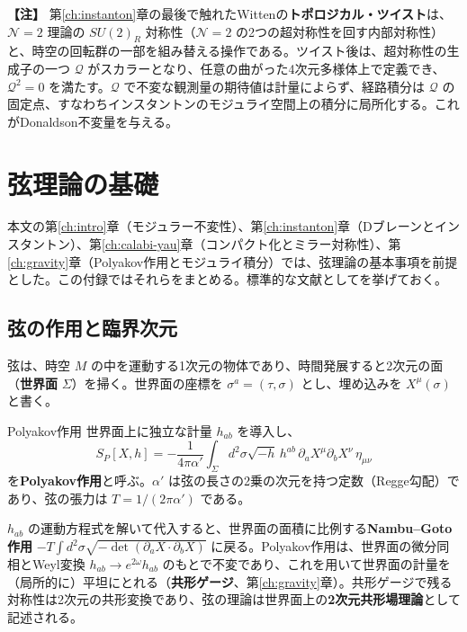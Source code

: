 \documentclass[uplatex, dvipdfmx, book]{jsbook}
\let\origsection\section
\let\origsubsection\subsection
\let\origsubsubsection\subsubsection
\newcommand{\chapter}{\origsection}
\renewcommand{\section}{\origsubsection}
\renewcommand{\subsection}{\origsubsubsection}
\renewcommand{\subsubsection}{\paragraph}
\newenvironment{note}{\vspace{1ex}\par\footnotesize\noindent\textbf{【注】}}{\par\vspace{1ex}}
\begin{document}
\begin{note}
第\ref{ch:instanton}章の最後で触れたWittenの\textbf{トポロジカル・ツイスト}は、$\mathcal{N} = 2$ 理論の $SU(2)_R$ 対称性（$\mathcal{N} = 2$ の2つの超対称性を回す内部対称性）と、時空の回転群の一部を組み替える操作である。ツイスト後は、超対称性の生成子の一つ $\mathcal{Q}$ がスカラーとなり、任意の曲がった4次元多様体上で定義でき、$\mathcal{Q}^2 = 0$ を満たす。$\mathcal{Q}$ で不変な観測量の期待値は計量によらず、経路積分は $\mathcal{Q}$ の固定点、すなわちインスタントンのモジュライ空間上の積分に局所化する。これがDonaldson不変量を与える。
\end{note}


\chapter{弦理論の基礎}
\label{app:string}

本文の第\ref{ch:intro}章（モジュラー不変性）、第\ref{ch:instanton}章（Dブレーンとインスタントン）、第\ref{ch:calabi-yau}章（コンパクト化とミラー対称性）、第\ref{ch:gravity}章（Polyakov作用とモジュライ積分）では、弦理論の基本事項を前提とした。この付録ではそれらをまとめる。標準的な文献として\cite{polchinskistringtheoryvolume12005,polchinskistringtheoryvolume2005}を挙げておく。

\section{弦の作用と臨界次元}

弦は、時空 $M$ の中を運動する1次元の物体であり、時間発展すると2次元の面（\textbf{世界面} $\Sigma$）を掃く。世界面の座標を $\sigma^a = (\tau, \sigma)$ とし、埋め込みを $X^\mu(\sigma)$ と書く。

\begin{mydef}{Polyakov作用}{}
世界面上に独立な計量 $h_{ab}$ を導入し、
\begin{equation*}
    S_P[X, h] = -\frac{1}{4\pi\alpha'}\int_\Sigma d^2\sigma \sqrt{-h}\, h^{ab}\, \partial_a X^\mu \partial_b X^\nu\, \eta_{\mu\nu}
\end{equation*}
を\textbf{Polyakov作用}と呼ぶ。$\alpha'$ は弦の長さの2乗の次元を持つ定数（Regge勾配）であり、弦の張力は $T = 1/(2\pi\alpha')$ である。
\end{mydef}

$h_{ab}$ の運動方程式を解いて代入すると、世界面の面積に比例する\textbf{Nambu--Goto作用} $-T\int d^2\sigma\sqrt{-\det(\partial_aX\cdot\partial_bX)}$ に戻る。Polyakov作用は、世界面の微分同相とWeyl変換 $h_{ab} \to e^{2\omega}h_{ab}$ のもとで不変であり、これを用いて世界面の計量を（局所的に）平坦にとれる（\textbf{共形ゲージ}、第\ref{ch:gravity}章）。共形ゲージで残る対称性は2次元の共形変換であり、弦の理論は世界面上の\textbf{2次元共形場理論}として記述される。
\end{document}
